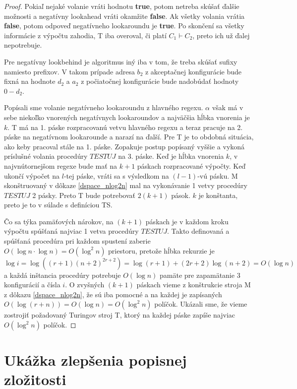 \begin{proof}
Pokiaľ nejaké volanie vráti hodnotu \textbf{true}, potom netreba skúšať ďalšie možnosti a negatívny lookahead vráti okamžite \textbf{false}. Ak všetky volania vrátia \textbf{false}, potom odpoveď negatívneho lookaroundu je \textbf{true}. Po skončení sa všetky informácie z výpočtu zahodia, T iba overoval, či platí $C_1\vdash C_2$, preto ich už ďalej nepotrebuje.

Pre negatívny lookbehind je algoritmus iný iba v tom, že treba skúšať sufixy namiesto prefixov. V takom prípade adresa $b_2$ z akceptačnej konfigurácie bude fixná na hodnote $d_2$ a $a_2$ z počiatočnej konfigurácie bude nadobúdať hodnoty $0-d_2$.

Popísali sme volanie negatívneho lookaroundu z hlavného regexu. $\alpha$ však má v sebe niekoľko vnorených negatívnych lookaroundov a najväčšia hĺbka vnorenia je $k$. T má na 1. páske rozpracovanú vetvu hlavného regexu a teraz pracuje na 2. páske na negatívnom lookarounde a narazí na ďalší. Pre T je to obdobná situácia, ako keby pracoval stále na 1. páske. Zopakuje postup popísaný vyššie a vykoná príslušné volania procedúry $TESTUJ$ na 3. páske. Keď je hĺbka vnorenia $k$, v najvnútornejšom regexe bude mať na $k+1$ páskach rozpracované výpočty. Keď ukončí výpočet na $l$-tej páske, vráti sa s výsledkom na $(l-1)$-vú pásku. M skonštruovaný v dôkaze \ref{dspace_nlog2n} mal na vykonávanie 1 vetvy procedúry $TESTUJ$ 2 pásky. Preto T bude potrebovať $2(k+1)$ pások. $k$ je konštanta, preto je to v súlade s definíciou TS.

Čo sa týka pamäťových nárokov, na $(k+1)$ páskach je v každom kroku výpočtu spúšťaná najviac 1 vetva procedúry $TESTUJ$. Takto definovaná a spúšťaná procedúra pri každom spustení zaberie $O(\log n\cdot\log n) = O(\log ^2 n)$ priestoru, pretože hĺbka rekurzie je $$\log i = \log ((r+1)(n+2)^{2r+2}) = \log (r+1) + (2r+2)\log (n+2) = O(\log n)$$ a každá inštancia procedúry potrebuje $O(\log n)$ pamäte pre zapamätanie 3 konfigurácií a čísla $i$. O zvyšných $(k+1)$ páskach vieme z konštrukcie stroja M z dôkazu \ref{dspace_nlog2n}, že sú iba pomocné a na každej je zapísaných $O(\log (r+n)) = O(\log n) = O(\log^2 n)$ políčok. Ukázali sme, že vieme zostrojiť požadovaný Turingov stroj T, ktorý na každej páske zapíše najviac $O(\log^2 n)$ políčok.
\end{proof}

\section[Ukážka k popisnej zložitosti]{Ukážka zlepšenia popisnej zložitosti}
\label{vzlozitost}


